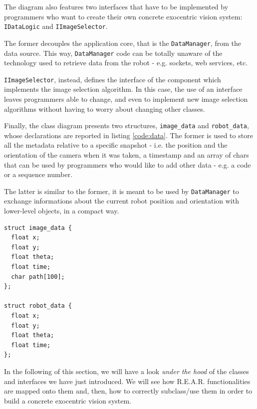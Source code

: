 %
The diagram also features two interfaces that have to be implemented 
by programmers who want to create their own concrete exocentric 
vision system: \texttt{IDataLogic} and 
\texttt{IImageSelector}.
%

%
The former decouples the application 
core, that is the \texttt{DataManager}, from the data source.
This way, \texttt{DataManager} code can be totally unaware of 
the technology used to retrieve data from the robot - e.g. 
sockets, web services, etc.
%

%
\texttt{IImageSelector}, instead, defines the interface 
of the component which implements the image selection algorithm.
%
In this case, the use of an interface leaves programmers 
able to change, and even to implement new image 
selection algorithms without having to worry about
changing other classes.
%

%
Finally, the class diagram presents two structures, 
\texttt{image\_data} and \texttt{robot\_data}, whose 
declarations are reported in listing \ref{code:data}.
%
The former is used to store all the metadata 
relative to a specific snapshot - i.e. the position 
and the orientation of the camera when it was taken, 
a timestamp and an array of chars that can be used by 
programmers who would like to add other data - e.g. 
a code or a sequence number.
%

%
The latter is similar to the former, it is meant to be 
used by \texttt{DataManager} to exchange informations
about the current robot position and orientation with 
lower-level objects, in a compact way.
%
\begin{lstlisting}[caption={\textsf{R.E.A.R.} data structures}, label={code:data}, frame=trBL]
struct image_data {
  float x;
  float y;
  float theta;
  float time;
  char path[100];
};

struct robot_data {
  float x;
  float y;
  float theta;
  float time;
};
\end{lstlisting}
%

%
In the following of this section, we will have a look 
\textit{under the hood} of the classes and interfaces 
we have just introduced.
%
We will see how \textsf{R.E.A.R.} functionalities are 
mapped onto them and, then, how to correctly subclass/use
them in order to build a concrete exocentric vision system.
%

%

